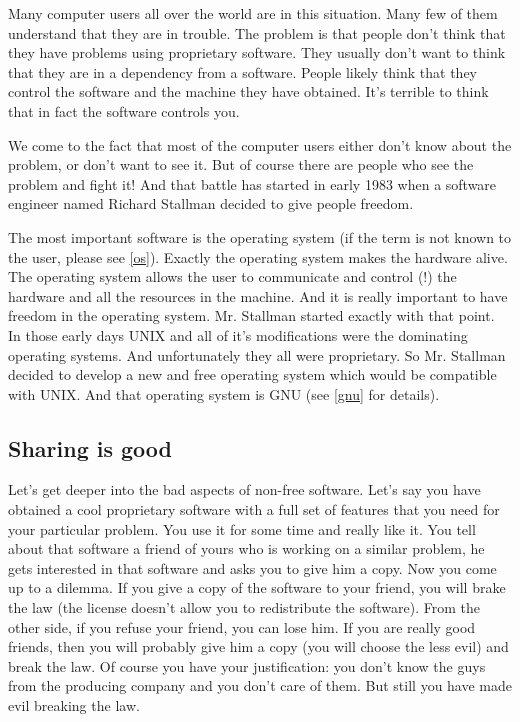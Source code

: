 Many computer users all over the world are in this situation. Many few of them understand that they are in trouble. The problem is that people don't think that they have problems using proprietary software. They usually don't want to think that they are in a dependency from a software. People likely think that they control the software and the machine they have obtained. It's terrible to think that in fact the software controls you.

We come to the fact that most of the computer users either don't know about the problem, or don't want to see it. But of course there are people who see the problem and fight it! And that battle has started in early 1983 when a software engineer named Richard Stallman decided to give people freedom. 

The most important software is the operating system (if the term is not known to the user, please see \ref{os}). Exactly the operating system makes the hardware alive. The operating system allows the user to communicate and control (!) the hardware and all the resources in the machine. And it is really important to have freedom in the operating system. Mr. Stallman started exactly with that point. In those early days UNIX and all of it's modifications were the dominating operating systems. And unfortunately they all were proprietary. So Mr. Stallman decided to develop a new and free operating system which would be compatible with UNIX. And that operating system is GNU (see \ref{gnu} for details).

\subsection{Sharing is good}
Let's get deeper into the bad aspects of non-free software. Let's say you have obtained a cool proprietary software with a full set of features that you need for your particular problem. You use it for some time and really like it. You tell about that software a friend of yours who is working on a similar problem, he gets interested in that software and asks you to give him a copy. Now you come up to a dilemma. If you give a copy of the software to your friend, you will brake the law (the license doesn't allow you to redistribute the software). From the other side, if you refuse your friend, you can lose him. If you are really good friends, then you will probably give him a copy (you will choose the less evil) and break the law. Of course you have your justification: you don't know the guys from the producing company and you don't care of them. But still you have made evil breaking the law.

